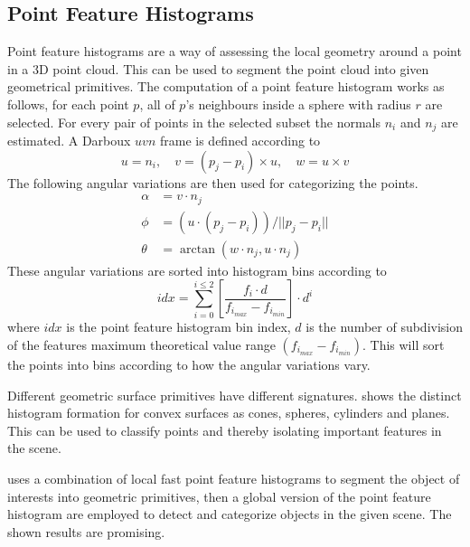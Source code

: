 \subsection{Point Feature Histograms}
Point feature histograms are a way of assessing the local geometry around a point in a
3D point cloud. This can be used to segment the point cloud into given geometrical
primitives. The computation of a point feature histogram works as follows, for each point
$p$, all of $p$'s neighbours inside a sphere with radius $r$ are selected. For every pair
of points in the selected subset the normals $n_i$ and $n_j$ are estimated. A Darboux
$uvn$ frame is defined according to 
\begin{equation}
    u = n_i, \quad v = (p_j - p_i)\times u, \quad w = u \times v
\end{equation}
The following angular variations are then used for categorizing the points. \cite{pfh}
\begin{equation}
    \begin{aligned}
        \alpha &= v \cdot n_j \\
        \phi &= (u \cdot (p_j - p_i)) / || p_j - p_i|| \\
        \theta &= \arctan (w \cdot n_j, u \cdot n_j)
    \end{aligned}
\end{equation}
These angular variations are sorted into histogram bins according to 
\begin{equation}
    idx = \sum_{i=0}^{i \leq 2} \left [ \frac{f_i \cdot d}{f_{i_{max}} - f_{i_{min}}}
    \right] \cdot d^i
\end{equation}
where $idx$ is the point feature histogram bin index, $d$ is the number of subdivision of
the features maximum theoretical value range $(f_{i_{max}} - f_{i_{min}})$. This will sort
the points into bins according to how the angular variations vary. 

Different geometric surface primitives have different signatures. \cite{pfh-geometric}
shows the distinct histogram formation for convex surfaces as cones, spheres, cylinders
and planes. This can be used to classify points and thereby isolating important features
in the scene. 

\cite{pfh-segmenting} uses a combination of local fast point feature histograms to segment
the object of interests into geometric primitives, then a global version of the point
feature histogram are employed to detect and categorize objects in the given scene. The
shown results are promising. 

